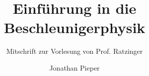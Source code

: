\documentclass[12pt,DIV=15,a4paper,draft=false]{scrartcl}
\author{Jonathan Pieper}
\title{Einführung in die Beschleunigerphysik}
\subtitle{Mitschrift zur Vorlesung von Prof. Ratzinger}
\begin{document}
\begin{titlepage}
\maketitle
\tableofcontents
\end{titlepage}
\end{document}
